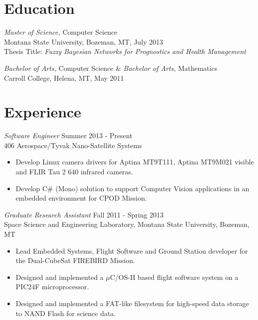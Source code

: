 \documentclass[line,margin]{res}
\begin{document}
\address{2157 Pacific Ave B103, Costa Mesa, CA 92627}
\address{(949) 293-4039 -  nick.ryhajlo@gmail.com}

 
\begin{resume}
 
\section{Education} {\sl Master of Science,} Computer Science \\
                Montana State University, Bozeman, MT, July 2013 \\
                Thesis Title: \textit{Fuzzy Bayesian Networks for Prognostics and Health Management}

				{\sl Bachelor of Arts,} Computer Science \& {\sl Bachelor of Arts,} Mathematics \\
                Carroll College, Helena, MT, 
                May 2011
                
 
\section{Experience}{\sl Software Engineer} \hfill Summer 2013 - Present \\
               406 Aerospace/Tyvak Nano-Satellite Systems
                 \begin{itemize}  \itemsep -2pt %
                 \item Develop Linux camera drivers for Aptina MT9T111, Aptina MT9M021 visible and FLIR Tau 2 640 infrared cameras.
                 \item Develop C\# (Mono) solution to support Computer Vision applications in an embedded environment for CPOD Mission.
                 
                \end{itemize}


                 {\sl Graduate Research Assistant} \hfill Fall 2011 - Spring 2013 \\
                Space Science and Engineering Laboratory,
                Montana State University, Bozeman, MT
                 \begin{itemize}  \itemsep -2pt %
                 \item Lead Embedded Systems, Flight Software and Ground Station developer for the Dual-CubeSat FIREBIRD Mission.
                 \item Designed and implemented a $\mu$C/OS-II based flight software system on a PIC24F microprocessor.
	      \item Designed and implemented a FAT-like filesystem for high-speed data storage to NAND Flash for science data.
                 

\end{itemize}
\end{resume}
\end{document}
